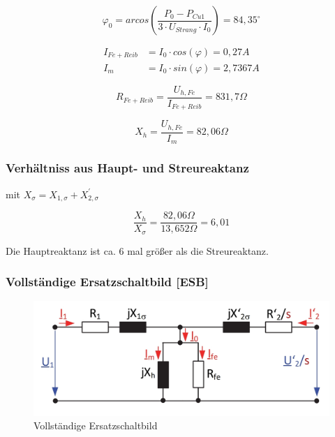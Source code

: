 \documentclass[conference]{IEEEtran}
\begin{document}
\begin{equation}
    \varphi_{0} = arcos\left( \dfrac{P_{0} - P_{Cu1} }{3 \cdot U_{Strang} \cdot I_{0} }\right) = 84,35^\circ
\end{equation}


\begin{align*}
    I_{Fe+Reib} & = I_{0} \cdot cos( \varphi ) = 0,27\si{A}   \\
    I_{m}       & = I_{0} \cdot sin( \varphi ) = 2,7367\si{A}
\end{align*}

\begin{equation}
    R_{Fe+Reib} = \dfrac{ U_{h, Fe} }{ I_{Fe+Reib} } = 831,7 \Omega
\end{equation}

\begin{equation}
    X_{h} = \dfrac{ U_{h, Fe} }{ I_{m} } = 82,06 \Omega
\end{equation}

\subsubsection{Verhältniss aus Haupt- und Streureaktanz}

mit $X_{ \sigma } =  X_{1, \sigma } + X_{2, \sigma }^\prime$

\begin{equation}
    \dfrac{ X_{h}}{X_{ \sigma }} = \dfrac{ 82,06 \Omega }{ 13,652 \Omega } = 6,01
\end{equation}

Die Hauptreaktanz ist ca. 6 mal größer als die Streureaktanz.

\subsubsection{Vollständige Ersatzschaltbild [ESB]}

\begin{figure}[htbp]
    \centering
    \includegraphics[width=\columnwidth]{./figures/Vollstaendiges_ESB.jpg}
    \caption{Vollständige Ersatzschaltbild}
    \label{fig:ESB_Vollstaendig}
\end{figure}
\end{document}
